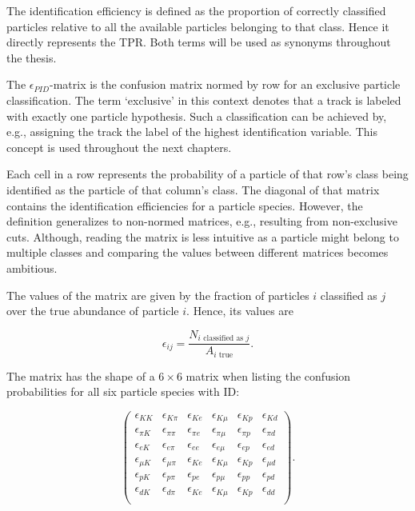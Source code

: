 The identification efficiency is defined as the proportion of correctly classified particles relative to all the available particles belonging to that class. Hence it directly represents the TPR. Both terms will be used as synonyms throughout the thesis.

The $\epsilon_{PID}$-matrix is the confusion matrix normed by row for an exclusive particle classification. The term `exclusive' in this context denotes that a track is labeled with exactly one particle hypothesis. Such a classification can be achieved by, e.g., assigning the track the label of the highest identification variable. This concept is used throughout the next chapters.

Each cell in a row represents the probability of a particle of that row's class being identified as the particle of that column's class. The diagonal of that matrix contains the identification efficiencies for a particle species.
However, the definition generalizes to non-normed matrices, e.g., resulting from non-exclusive cuts. Although, reading the matrix is less intuitive as a particle might belong to multiple classes and comparing the values between different matrices becomes ambitious.

The values of the matrix are given by the fraction of particles $i$ classified as $j$ over the true abundance of particle $i$. Hence, its values are

\begin{equation}
	\epsilon_{i j} = \frac{N_{i \text{ classified as } j}}{A_{i \text{ true}}}.
\end{equation}

The matrix has the shape of a $6 \times 6$ matrix when listing the confusion probabilities for all six particle species with ID:

\begin{equation}
	\begin{pmatrix}
		\epsilon_{K K} & \epsilon_{K \pi} & \epsilon_{K e} & \epsilon_{K \mu} & \epsilon_{K p} & \epsilon_{K d} \\
		\epsilon_{\pi K} & \epsilon_{\pi \pi} & \epsilon_{\pi e} & \epsilon_{\pi \mu} & \epsilon_{\pi p} & \epsilon_{\pi d} \\
		\epsilon_{e K} & \epsilon_{e \pi} & \epsilon_{e e} & \epsilon_{e \mu} & \epsilon_{e p} & \epsilon_{e d} \\
		\epsilon_{\mu K} & \epsilon_{\mu \pi} & \epsilon_{K e} & \epsilon_{K \mu} & \epsilon_{K p} & \epsilon_{\mu d} \\
		\epsilon_{p K} & \epsilon_{p \pi} & \epsilon_{p e} & \epsilon_{p \mu} & \epsilon_{p p} & \epsilon_{p d} \\
		\epsilon_{d K} & \epsilon_{d \pi} & \epsilon_{K e} & \epsilon_{K \mu} & \epsilon_{K p} & \epsilon_{d d} \\
	\end{pmatrix}.
\end{equation}

